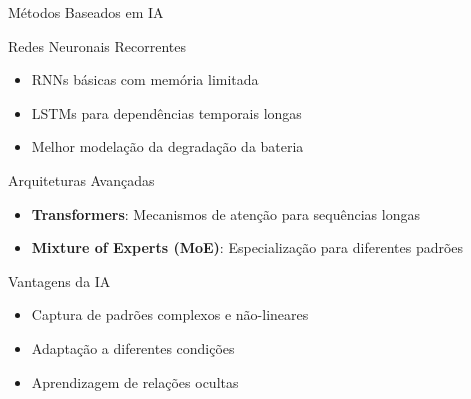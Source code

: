 \documentclass[aspectratio=169,xcolor=dvipsnames]{beamer}
\begin{document}
\begin{frame}{Métodos Baseados em IA}
  \begin{block}{Redes Neuronais Recorrentes}
    \begin{itemize}
      \item RNNs básicas com memória limitada
      \item LSTMs para dependências temporais longas
      \item Melhor modelação da degradação da bateria
    \end{itemize}
  \end{block}
  
  
  \begin{block}{Arquiteturas Avançadas}
    \begin{itemize}
      \item \textbf{Transformers}: Mecanismos de atenção para sequências longas
      \item \textbf{Mixture of Experts (MoE)}: Especialização para diferentes padrões
    \end{itemize}
  \end{block}
  
  \begin{exampleblock}{Vantagens da IA}
    \begin{itemize}
      \item Captura de padrões complexos e não-lineares
      \item Adaptação a diferentes condições
      \item Aprendizagem de relações ocultas
    \end{itemize}
  \end{exampleblock}
\end{frame}
\end{document}
